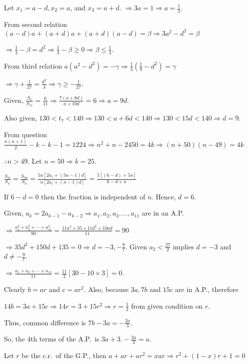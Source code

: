   Let $x_1 = a - d, x_2 = a$, and $x_3 = a + d$. $\Rightarrow 3a = 1\Rightarrow a = \frac{1}{3}$.

  From second relation $(a - d)a + (a + d)a + (a + d)(a - d) = \beta \Rightarrow 3a^2 - d^2 = \beta$

  $\Rightarrow \frac{1}{3} - \beta = d^2 \Rightarrow \frac{1}{3} - \beta \geq
  0 \Rightarrow \beta \leq \frac{1}{3}$.

  From third relation $a(a^2 - d^2) = -\gamma \Rightarrow \frac{1}{3}\left(\frac{1}{9} - d^2\right)
  = \gamma$

  $\Rightarrow \gamma + \frac{1}{27} = \frac{d^2}{3}\Rightarrow \gamma\geq -\frac{1}{27}$.
\item Given, $\frac{S_7}{S_{11}} = \frac{6}{11} \Rightarrow \frac{7(a + 6d)}{a + 10d} = 6 \Rightarrow a =
  9d$.

  Also given, $130 < t_7 < 140 \Rightarrow 130 < a + 6d < 140 \Rightarrow 130 < 15d < 140 \Rightarrow d =
  9$.
\item From question $\frac{n(n + 1)}{2} - k - k - 1 = 1224 \Rightarrow n^2 + n - 2450 = 4k\Rightarrow (n +
  50)(n - 49) = 4k$

  $\therefore n > 49$. Let $n = 50\Rightarrow k = 25$.
\item $\frac{S_m}{S_n} = \frac{S_{5n}}{S_n} = \frac{5n[2a_1 + (5n - 1)d]}{n[2a_1 + (n - 1)d]} = \frac{5[(6 -
    d) + 5n]}{6 - d + n}$

  If $6 - d = 0$ then the fraction is independent of $n$. Hence, $d = 6$.
\item Given, $a_k = 2a_{k - 1} - a_{k - 2}\Rightarrow a_1, a_2, a_3, \ldots, a_{11}$ are in an A.P.

  $\Rightarrow \frac{a_1^2 + a_2^2 + \cdots + a_{11}^2}{90} = \frac{11a^2 + 35\times11d^2 + 10ad}{11} = 90$

  $\Rightarrow 35d^2 + 150d + 135 = 0 \Rightarrow d = -3, -\frac{9}{7}$. Given $a_2 < \frac{27}{2}$ implies
  $d = -3$ and $d\neq -\frac{9}{7}$.

  $\Rightarrow \frac{a_1 + a_2 + \cdots + a_{11}}{11} = \frac{11}{2}[30 - 10\times 3] = 0$.
\item Clearly $b = ar$ and $c = ar^2$. Also, because $3a, 7b$ and $15c$ are in A.P., therefore

  $14b = 3a + 15c\Rightarrow 14r = 3 + 15r^2 \Rightarrow r = \frac{1}{3}$ from given condition on $r$.

  Thus, common difference is $7b - 3a = -\frac{2a}{3}$.

  So, the $4$th terms of the A.P.\ is $3a + 3.-\frac{2a}{3} = a$.
\item Let $r$ be the c.r.\ of the G.P., then $a + ar + ar^2 = xar \Rightarrow r^2 + (1 - x)r + 1 = 0$

